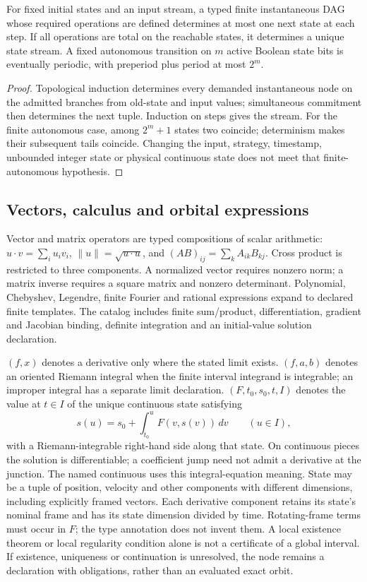 \begin{proposition}
For fixed initial states and an input stream, a typed finite instantaneous DAG
whose required operations are defined determines at most one next state at each
step. If all operations are total on the reachable states, it determines a unique
state stream. A fixed autonomous transition on $m$ active Boolean state bits is
eventually periodic, with preperiod plus period at most $2^m$.
\end{proposition}
\begin{proof}
Topological induction determines every demanded instantaneous node on the
admitted branches from old-state and input values; simultaneous commitment
then determines the next tuple. Induction
on steps gives the stream. For the finite autonomous case, among $2^m+1$ states
two coincide; determinism makes their subsequent tails coincide. Changing the
input, strategy, timestamp, unbounded integer state or physical continuous state
does not meet that finite-autonomous hypothesis.
\end{proof}

\subsection{Vectors, calculus and orbital expressions}
Vector and matrix operators are typed compositions of scalar arithmetic:
$u\cdot v=\sum_i u_i v_i$, $\|u\|=\sqrt{u\cdot u}$, and
$(AB)_{ij}=\sum_k A_{ik}B_{kj}$. Cross product is restricted to three
components. A normalized vector requires nonzero norm; a matrix inverse requires
a square matrix and nonzero determinant. Polynomial, Chebyshev, Legendre,
finite Fourier and rational expressions expand to declared finite templates.
The catalog includes finite sum/product, differentiation, gradient and Jacobian
binding, definite integration and an initial-value solution declaration.

$(f,x)$ denotes a derivative only where the stated limit exists.
$(f,a,b)$ denotes an oriented Riemann integral when the finite
interval integrand is integrable; an improper integral has a separate limit
declaration. $(F,t_0,s_0,t,I)$ denotes the value at $t\in I$ of the
unique continuous state satisfying
\[
 s(u)=s_0+\int_{t_0}^{u}F(v,s(v))\,dv\qquad(u\in I),
\]
with a Riemann-integrable right-hand side along that state. On continuous
pieces the solution is differentiable; a coefficient jump need not admit a
derivative at the junction. The named continuous  uses this
integral-equation meaning. State may be a tuple of position, velocity and other
components with different dimensions, including explicitly framed vectors.
Each derivative component retains its state's nominal frame and has its state
dimension divided by time. Rotating-frame terms must occur in $F$; the type
annotation does not invent them. A local existence theorem or local regularity
condition alone is not a certificate of a global interval.
If existence, uniqueness or continuation is unresolved, the node remains a
declaration with obligations, rather than an evaluated exact orbit.

